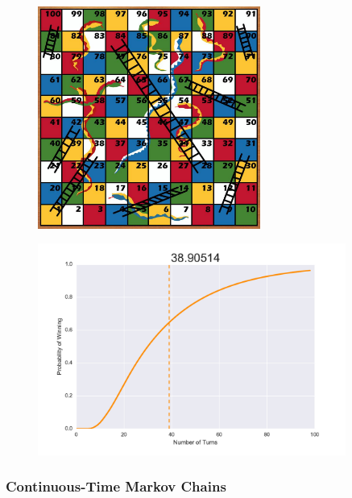 \documentclass{beamer}
\begin{document}
\begin{frame}
\begin{figure}
  \includegraphics[width=0.65\textwidth]{snakes_and_ladders}
\end{figure}
\end{frame}

\begin{frame}
\begin{figure}
  \includegraphics[width=0.9\textwidth]{snakesladdersabs}
\end{figure}
\end{frame}



\begin{frame}
\frametitle{Continuous-Time Markov Chains}
\begin{figure}
  
\end{figure}
\end{frame}
\end{document}

